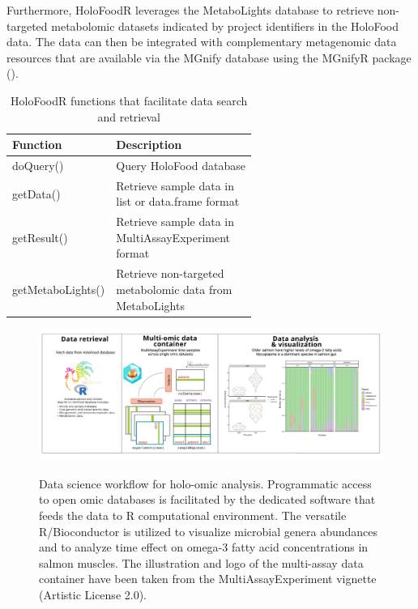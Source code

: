 \documentclass[unnumsec,webpdf,namedate,modern,large]{oup-authoring-template}%
\begin{document}
Furthermore, HoloFoodR leverages the MetaboLights database to retrieve non-targeted metabolomic datasets indicated by project identifiers in the HoloFood data. The data can then be integrated with complementary metagenomic data resources that are available via the MGnify database using the MGnifyR package (\cite{mgnifyr}).

\vspace{-1em}

\begin{table}[H]
\begin{center}
\begin{minipage}{\linewidth}
\caption{HoloFoodR functions that facilitate data search and retrieval}\label{tab:holofoodr_functions}
    \begin{tabular}{l p{0.6\linewidth}}
        \toprule
        Function & Description \\ 
        \midrule
        doQuery() & Query HoloFood database \\
        getData() & Retrieve sample data in list or data.frame format \\
        getResult()  & Retrieve sample data in MultiAssayExperiment format \\
        getMetaboLights() & Retrieve non-targeted metabolomic data from MetaboLights \\
        \bottomrule
    \end{tabular}
\end{minipage}
\end{center}
\end{table}

\vspace{-1em}

\begin{figure}[t]
	\centering
    \includegraphics[width=1\textwidth]{holofoodr_workflow_9.png}
    \label{fig:workflow}
    \caption{Data science workflow for holo-omic analysis. Programmatic access to open omic databases is facilitated by the dedicated software that feeds the data to R computational environment. The versatile R/Bioconductor is utilized to visualize microbial genera abundances and to analyze  time effect on omega-3 fatty acid concentrations in salmon muscles. The illustration and logo of the multi-assay data container have been taken from the MultiAssayExperiment vignette (Artistic License 2.0).}
	\label{fig:workflow}
\end{figure}
\end{document}
